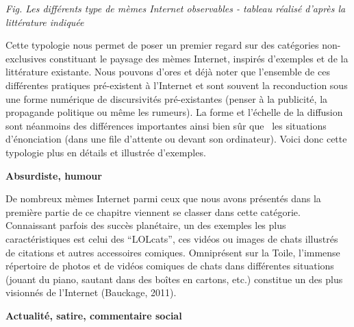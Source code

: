 {{{\color{black}
\textit{\textcolor[rgb]{0.0,0.0,0.039215688}{Fig. Les diff\'erents type
de m\`emes Internet observables - tableau r\'ealis\'e
d{\textquoteright}apr\`es la litt\'erature indiqu\'ee}}}

\textcolor[rgb]{0.0,0.0,0.039215688}{Cette typologie nous permet de
poser un premier regard sur des cat\'egories non-exclusives constituant
le paysage des m\`emes Internet, inspir\'es d{\textquoteright}exemples
et de la litt\'erature existante. Nous pouvons d{\textquoteright}ores
et d\'ej\`a noter que l{\textquoteright}ensemble de ces diff\'erentes
pratiques pr\'e-existent \`a l{\textquoteright}Internet et sont souvent
la reconduction sous une forme num\'erique de discursivit\'es
pr\'e-existantes (penser \`a la publicit\'e, la propagande politique ou
m\^eme les rumeurs). La forme et l{\textquoteright}\'echelle de la
diffusion sont n\'eanmoins des diff\'erences importantes ainsi bien
s\^ur que \ les situations d{\textquoteright}\'enonciation (dans une
file d{\textquoteright}attente ou devant son ordinateur). Voici donc
cette typologie plus en d\'etails et illustr\'ee
d{\textquoteright}exemples.}


\textbf{Absurdiste, humour}}

\textcolor[rgb]{0.0,0.0,0.039215688}{De nombreux m\`emes Internet parmi
ceux que nous avons pr\'esent\'es dans la premi\`ere partie de ce
chapitre viennent se classer dans cette cat\'egorie. Connaissant
parfois des succ\`es plan\'etaire, un des exemples les plus
caract\'eristiques est celui des
{\textquotedblleft}LOLcats{\textquotedblright}, ces vid\'eos ou images
de chats illustr\'es de citations et autres accessoires comiques.
Omnipr\'esent sur la Toile, l{\textquoteright}immense r\'epertoire de
photos et de vid\'eos comiques de chats dans diff\'erentes situations
(jouant du piano, sautant dans des bo\^ites en cartons, etc.) constitue
un des plus visionn\'es de l{\textquoteright}Internet (Bauckage,
2011).}

\textbf{Actualit\'e, satire, commentaire social}}

